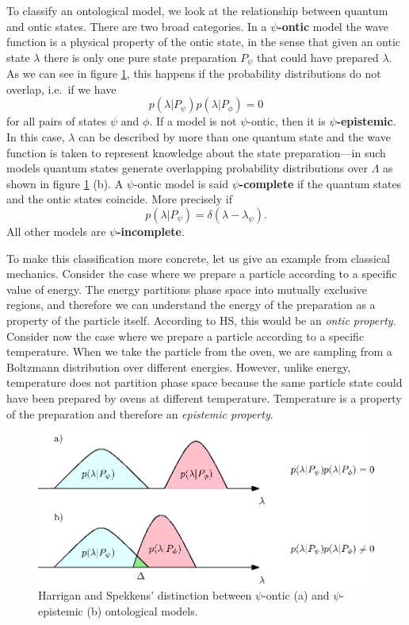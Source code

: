 \documentclass[twocolumn,prl,floatfix,superscriptaddress]{revtex4-2}
\begin{document}
To classify an ontological model, we look at the relationship between quantum and ontic states. There are two broad categories. In a \textbf{$\psi$-ontic} model the wave function is a physical property of the ontic state, in the sense that given an ontic state $\lambda$ there is only one pure state preparation $P_\psi$ that could have prepared $\lambda$. As we can see in figure \ref{overlap}, this happens if the probability distributions do not overlap, i.e.\ if we have
\begin{equation}\label{ontic_condition}
	p(\lambda | P_{\psi})p(\lambda|P_{\phi})=0
\end{equation}
for all pairs of states $\psi$ and $\phi$. If a model is not $\psi$-ontic, then it is \textbf{$\psi$-epistemic}. In this case, $\lambda$ can be described by more than one quantum state and the wave function is taken to represent knowledge about the state preparation---in such models quantum states generate overlapping probability distributions over $\Lambda$ as shown in figure \ref{overlap} (b). A $\psi$-ontic model is said \textbf{$\psi$-complete} if the quantum states and the ontic states coincide. More precisely if 
\begin{equation}\label{complete_condition}
	p(\lambda|P_\psi)=\delta(\lambda-\lambda_{\psi}).
\end{equation}
All other models are \textbf{$\psi$-incomplete}.

To make this classification more concrete, let us give an example from classical mechanics. Consider the case where we prepare a particle according to a specific value of energy. The energy partitions phase space into mutually exclusive regions, and therefore we can understand the energy of the preparation as a property of the particle itself. According to HS, this would be an \emph{ontic property}. Consider now the case where we prepare a particle according to a specific temperature. When we take the particle from the oven, we are sampling from a Boltzmann distribution over different energies. However, unlike energy, temperature does not partition phase space because the same particle state could have been prepared by ovens at different temperature. Temperature is a property of the preparation and therefore an \emph{epistemic property}. 

\begin{figure}
\includegraphics[scale=.7]{ontic}
\caption{\footnotesize{Harrigan and Spekkens' distinction between $\psi$-ontic (a) and $\psi$-epistemic (b) ontological models.}}\label{overlap}
\end{figure}
\end{document}
